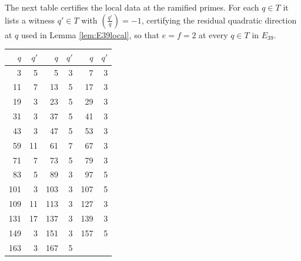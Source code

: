 The next table certifies the local data at the ramified primes. For
each $q\in T$ it lists a witness $q'\in T$ with
$\left(\frac{q'}{q}\right)=-1$, certifying the residual quadratic
direction at $q$ used in Lemma \ref{lem:E39local}, so that $e=f=2$ at
every $q\in T$ in $E_{39}$.

\begin{center}
\begin{tabular}{r r@{\qquad}r r@{\qquad}r r}
\toprule
$q$ & $q'$ & $q$ & $q'$ & $q$ & $q'$\\
\midrule
3 & 5 & 5 & 3 & 7 & 3 \\
11 & 7 & 13 & 5 & 17 & 3 \\
19 & 3 & 23 & 5 & 29 & 3 \\
31 & 3 & 37 & 5 & 41 & 3 \\
43 & 3 & 47 & 5 & 53 & 3 \\
59 & 11 & 61 & 7 & 67 & 3 \\
71 & 7 & 73 & 5 & 79 & 3 \\
83 & 5 & 89 & 3 & 97 & 5 \\
101 & 3 & 103 & 3 & 107 & 5 \\
109 & 11 & 113 & 3 & 127 & 3 \\
131 & 17 & 137 & 3 & 139 & 3 \\
149 & 3 & 151 & 3 & 157 & 5 \\
163 & 3 & 167 & 5 &  &  \\
\bottomrule
\end{tabular}
\end{center}
